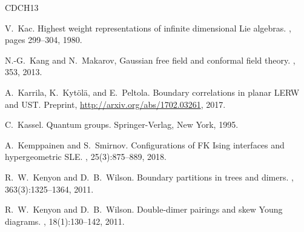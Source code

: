 \documentclass[oneside,english]{amsart}
\numberwithin{equation}{section}
\numberwithin{figure}{section}
\theoremstyle{plain}
\theoremstyle{plain}
\theoremstyle{plain}
\theoremstyle{remark}
\theoremstyle{plain}
\theoremstyle{plain}
\theoremstyle{plain}
\theoremstyle{plain}
\theoremstyle{plain}
\theoremstyle{plain}
\theoremstyle{plain}
\theoremstyle{plain}
\begin{document}
\begin{thebibliography}{CDCH{\etalchar{+}}13}

V.~Kac.
\newblock Highest weight representations of infinite dimensional Lie algebras.
, pages 299--304, 1980.


N.-G.~Kang and N.~Makarov, 
\newblock Gaussian free field and conformal field theory.
, 353, 2013.


A.~Karrila, K.~Kyt{\"o}l{\"a}, and E.~Peltola.
\newblock Boundary correlations in planar LERW and UST.
\newblock Preprint, \url{http://arxiv.org/abs/1702.03261}, 2017.

C.~Kassel.
\newblock Quantum groups.
\newblock Springer-Verlag, New York, 1995.

A.~Kemppainen and S.~Smirnov.
\newblock Configurations of FK Ising interfaces and hypergeometric SLE.
, 25(3):875--889, 2018.



R.~W.~Kenyon and D.~B.~Wilson.
\newblock Boundary partitions in trees and dimers.
, 363(3):1325--1364, 2011.

R.~W.~Kenyon and D.~B.~Wilson.
\newblock Double-dimer pairings and skew Young diagrams.
, 18(1):130--142, 2011.


\end{thebibliography}
\end{document}
